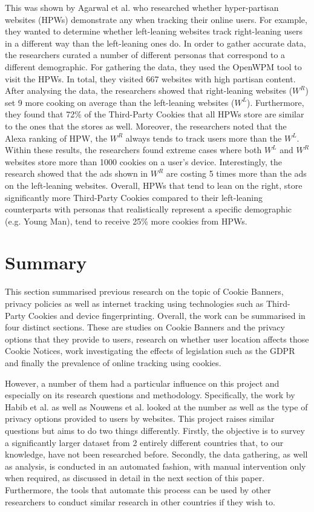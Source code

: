 \documentclass[../main.tex]{subfiles}
\begin{document}
This was shown by Agarwal et al. \cite{agarwal2020stop} who researched whether hyper-partisan websites (HPWs) demonstrate any  when tracking their online users. For example, they wanted to determine whether left-leaning websites track right-leaning users in a different way than the left-leaning ones do. In order to gather accurate data, the researchers curated a number of different personas that correspond to a different demographic. For gathering the data, they used the OpenWPM tool to visit the HPWs. In total, they visited 667 websites with high partisan content. After analysing the data, the researchers showed that right-leaning websites ($W^R$) set 9 more cooking on average than the left-leaning websites ($W^L$). Furthermore, they found that 72\% of the Third-Party Cookies that all HPWs store are similar to the ones that the  stores as well. Moreover, the researchers noted that the Alexa ranking of HPW, the $W^R$ always tends to track users more than the $W^L$. Within these results, the researchers found extreme cases where both $W^L$ and $W^R$ websites store more than 1000 cookies on a user’s device. Interestingly, the research showed that the ads shown in $W^R$ are costing 5 times more than the ads on the left-leaning websites. Overall, HPWs that tend to lean on the right, store significantly more Third-Party Cookies compared to their left-leaning counterparts with personas that realistically represent a specific demographic (e.g. Young Man), tend to receive 25\% more cookies from HPWs.

\section{Summary}
This section summarised previous research on the topic of Cookie Banners, privacy policies as well as internet tracking using technologies such as Third-Party Cookies and device fingerprinting. Overall, the work can be summarised in four distinct sections. These are studies on Cookie Banners and the privacy options that they provide to users, research on whether user location affects those Cookie Notices, work investigating the effects of legislation such as the GDPR and finally the prevalence of online tracking using cookies. 

However, a number of them had a particular influence on this project and especially on its research questions and methodology. Specifically, the work by Habib et al. as well as Nouwens et al. looked at the number as well as the type of privacy options provided to users by websites. This project raises similar questions but aims to do two things differently. Firstly, the objective is to survey a significantly larger dataset from 2 entirely different countries that, to our knowledge, have not been researched before. Secondly, the data gathering, as well as analysis, is conducted in an automated fashion, with manual intervention only when required, as discussed in detail in the next section of this paper. Furthermore, the tools that automate this process can be used by other researchers to conduct similar research in other countries if they wish to.
\end{document}
